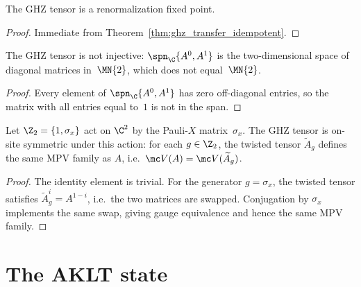 \begin{theorem}\label{thm:ghz_is_rfp}
    \leanok
    The GHZ tensor is a renormalization fixed point.
\end{theorem}

\begin{proof}
    \leanok
    Immediate from Theorem~\ref{thm:ghz_transfer_idempotent}.
\end{proof}

\begin{theorem}\label{thm:ghz_not_injective}
    \leanok
    The GHZ tensor is not injective: $\spn_{\C}\{A^0, A^1\}$ is the
    two-dimensional space of diagonal matrices in~$\MN{2}$, which does
    not equal~$\MN{2}$.
\end{theorem}

\begin{proof}
    \leanok
    Every element of $\spn_{\C}\{A^0, A^1\}$ has zero off-diagonal
    entries, so the matrix with all entries equal to~$1$ is not in the
    span.
\end{proof}

\begin{theorem}\label{thm:ghz_z2_symmetric}
    \leanok
    Let $\Z_2 = \{1, \sigma_x\}$ act on $\C^2$ by the Pauli-$X$
    matrix~$\sigma_x$.  The GHZ tensor is on-site symmetric under this
    action: for each $g \in \Z_2$, the twisted tensor $\widetilde A_g$
    defines the same MPV family as $A$, i.e.\ $\mc V(A)=\mc V(\widetilde
    A_g)$.
\end{theorem}

\begin{proof}
    \leanok
    The identity element is trivial.  For the generator
    $g = \sigma_x$, the twisted tensor satisfies
    $\widetilde A_g^i = A^{1-i}$, i.e.\ the two matrices are swapped.
    Conjugation by $\sigma_x$ implements the same swap, giving
    gauge equivalence and hence the same MPV family.
\end{proof}

\section{The AKLT state}\label{sec:aklt}

